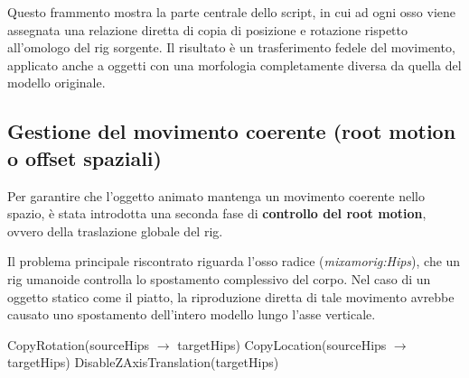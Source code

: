 \vspace{5mm} %
Questo frammento mostra la parte centrale dello script, in cui ad ogni osso viene assegnata una relazione diretta di copia di posizione e rotazione rispetto all'omologo del rig sorgente. Il risultato è un trasferimento fedele del movimento, applicato anche a oggetti con una morfologia completamente diversa da quella del modello originale.

\subsection{Gestione del movimento coerente (root motion o offset spaziali)}

Per garantire che l'oggetto animato mantenga un movimento coerente nello spazio, è stata introdotta una seconda fase di \textbf{controllo del root motion}, ovvero della traslazione globale del rig.

Il problema principale riscontrato riguarda l'osso radice (\textit{mixamorig:Hips}), che un rig umanoide controlla lo spostamento complessivo del corpo. Nel caso di un oggetto statico come il piatto, la riproduzione diretta di tale movimento avrebbe causato uno spostamento dell'intero modello lungo l'asse verticale.

\vspace{5mm}
\begin{minipage}{1\linewidth}
\begin{algorithm}[H]
\caption{ApplyRootMotionFiltering} \label{alg2:cap}
CopyRotation(sourceHips $\rightarrow$ targetHips)\;
CopyLocation(sourceHips $\rightarrow$ targetHips)\;
DisableZAxisTranslation(targetHips)\;

\end{algorithm}
\end{minipage}
\vspace{5mm}

